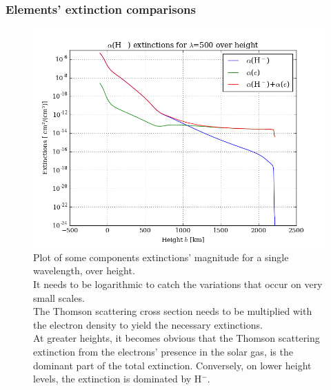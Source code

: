 \documentclass[11pt,a4paper,notitlepage]{article}
\begin{document}
\subsubsection{Elements' extinction comparisons}
\begin{figure}[H]
\center

	\includegraphics[scale=0.42]{../figs/2cont_ext_over_h_thom.png}
	\caption{Plot of some components extinctions' magnitude for a single wavelength, over height.\\
	It needs to be logarithmic to catch the variations that occur on very small scales.\\
	The Thomson scattering cross section needs to be multiplied with the electron density to yield the necessary extinctions.\\
	At greater heights, it becomes obvious that the Thomson scattering extinction from the electrons' presence in the solar gas, is the dominant part of the total extinction. Conversely, on lower height levels, the extinction is dominated by H$^-$.}
\end{figure}
\end{document}

